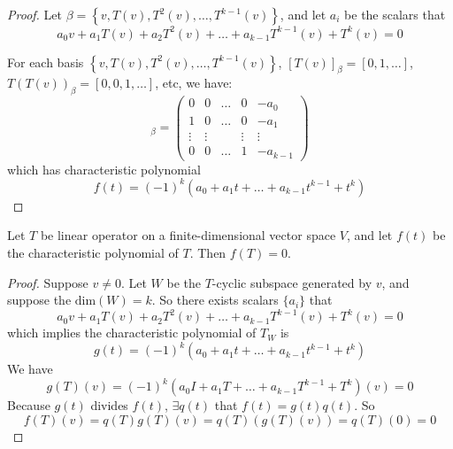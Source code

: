 \begin{proof}
    Let $\beta = \left\{v, T(v), T^2(v), \dots, T^{k-1}(v) \right\}$, and let $a_i$ be the scalars that 
    \begin{equation*}
            a_0 v + a_1 T(v) + a_2 T^2(v) + \dots + a_{k-1} T^{k-1}(v) + T^k(v) = 0
    \end{equation*}
    
    For each basis $\left\{v, T(v), T^2(v), \dots, T^{k-1}(v) \right\}$, $[T(v)]_\beta = [0,1,\dots]$, $T(T(v))_\beta = [0,0,1,\dots]$, etc, we have:
    \begin{equation*}
        [T_W]_\beta = \begin{pmatrix}
            0 & 0 & \dots & 0 & - a_0 \\
            1 & 0 & \dots & 0 & -a_1\\
            \vdots & \vdots  & & \vdots & \vdots \\
            0 & 0 & \dots & 1 & - a_{k-1}
        \end{pmatrix}
    \end{equation*}
    which has characteristic polynomial 
    \begin{equation*}
        f(t) = (-1)^k (a_0 + a_1 t + \dots + a_{k-1} t^{k-1} + t^k)
    \end{equation*}
\end{proof}

\begin{theorem}
    Let $T$ be linear operator on a finite-dimensional vector space $V$, and let $f(t)$ be the characteristic polynomial of $T$. Then $f(T) = 0$.
\end{theorem}

\begin{proof}
    Suppose $v \neq 0$. Let $W$ be the $T$-cyclic subspace generated by $v$, and suppose the $\text{dim}(W)=k$. So there exists scalars $\{a_i\}$ that 
    \begin{equation*}
        a_0 v + a_1 T(v) + a_2 T^2(v) + \dots + a_{k-1} T^{k-1}(v) + T^k(v) = 0
    \end{equation*}
    which implies the characteristic polynomial of $T_W$ is
    \begin{equation*}
        g(t) = (-1)^k (a_0 + a_1 t + \dots + a_{k-1} t^{k-1} + t^k)
    \end{equation*}
    We have
    \begin{equation*}
        g(T)(v) = (-1)^k (a_0 I + a_1 T + \dots + a_{k-1} T^{k-1} + T^k)(v) = 0
    \end{equation*}
    Because $g(t)$ divides $f(t)$, $\exists q(t)$ that $f(t) = g(t) q(t)$. So
    \begin{equation*}
        f(T)(v) = q(T)g(T)(v) = q(T) (g(T)(v)) = q(T)(0) = 0
    \end{equation*}
\end{proof}



